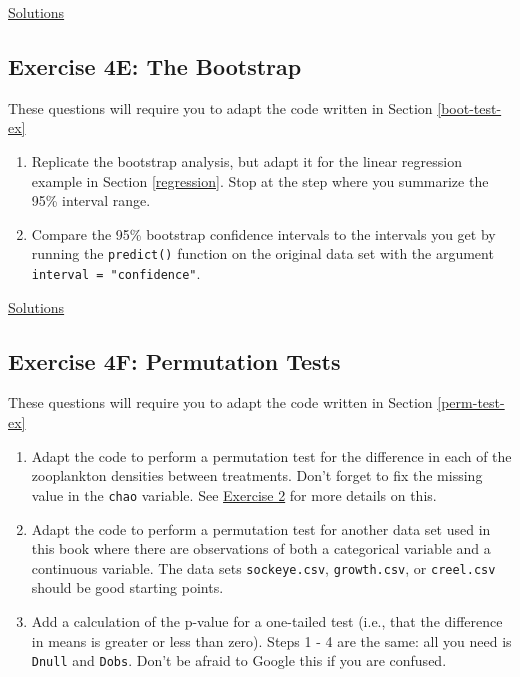 \documentclass[]{book}
\providecommand{\tightlist}{%
  \setlength{\itemsep}{0pt}\setlength{\parskip}{0pt}}
\begin{document}
\protect\hyperlink{ex4d-answers}{Solutions}

\hypertarget{exercise-4e-the-bootstrap}{%
\subsection*{Exercise 4E: The Bootstrap}\label{exercise-4e-the-bootstrap}}

These questions will require you to adapt the code written in Section \ref{boot-test-ex}

\begin{enumerate}
\def\labelenumi{\arabic{enumi}.}
\tightlist
\item
  Replicate the bootstrap analysis, but adapt it for the linear regression example in Section \ref{regression}. Stop at the step where you summarize the 95\% interval range.
\item
  Compare the 95\% bootstrap confidence intervals to the intervals you get by running the \texttt{predict()} function on the original data set with the argument \texttt{interval\ =\ "confidence"}.
\end{enumerate}

\protect\hyperlink{ex4e-answers}{Solutions}

\hypertarget{exercise-4f-permutation-tests}{%
\subsection*{Exercise 4F: Permutation Tests}\label{exercise-4f-permutation-tests}}

These questions will require you to adapt the code written in Section \ref{perm-test-ex}

\begin{enumerate}
\def\labelenumi{\arabic{enumi}.}
\tightlist
\item
  Adapt the code to perform a permutation test for the difference in each of the zooplankton densities between treatments. Don't forget to fix the missing value in the \texttt{chao} variable. See \protect\hyperlink{ex1b}{Exercise 2} for more details on this.
\item
  Adapt the code to perform a permutation test for another data set used in this book where there are observations of both a categorical variable and a continuous variable. The data sets \texttt{sockeye.csv}, \texttt{growth.csv}, or \texttt{creel.csv} should be good starting points.
\item
  Add a calculation of the p-value for a one-tailed test (i.e., that the difference in means is greater or less than zero). Steps 1 - 4 are the same: all you need is \texttt{Dnull} and \texttt{Dobs}. Don't be afraid to Google this if you are confused.
\end{enumerate}
\end{document}
